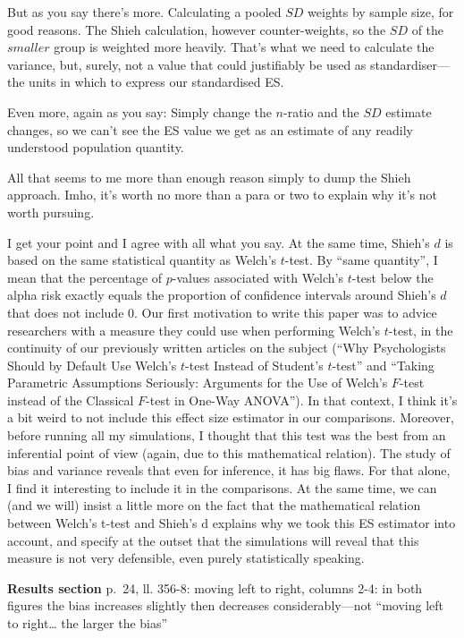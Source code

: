 \documentclass[
  12pt,
  french,
]{article}
\begin{document}
But as you say there's more. Calculating a pooled \(SD\) weights by
sample size, for good reasons. The Shieh calculation, however
counter-weights, so the \(SD\) of the \(smaller\) group is weighted more
heavily. That's what we need to calculate the variance, but, surely, not
a value that could justifiably be used as standardiser---the units in
which to express our standardised ES.

Even more, again as you say: Simply change the \(n\)-ratio and the
\(SD\) estimate changes, so we can't see the ES value we get as an
estimate of any readily understood population quantity.

All that seems to me more than enough reason simply to dump the Shieh
approach. Imho, it's worth no more than a para or two to explain why
it's not worth pursuing.

\color{blue} I get your point and I agree with all what you say. At the
same time, Shieh's \(d\) is based on the same statistical quantity as
Welch's \(t\)-test. By ``same quantity'', I mean that the percentage of
\(p\)-values associated with Welch's \(t\)-test below the alpha risk
exactly equals the proportion of confidence intervals around Shieh's
\(d\) that does not include 0. Our first motivation to write this paper
was to advice researchers with a measure they could use when performing
Welch's \(t\)-test, in the continuity of our previously written articles
on the subject (``Why Psychologists Should by Default Use Welch's
\(t\)-test Instead of Student's \(t\)-test'' and ``Taking Parametric
Assumptions Seriously: Arguments for the Use of Welch's \(F\)-test
instead of the Classical \(F\)-test in One-Way ANOVA''). In that
context, I think it's a bit weird to not include this effect size
estimator in our comparisons. Moreover, before running all my
simulations, I thought that this test was the best from an inferential
point of view (again, due to this mathematical relation). The study of
bias and variance reveals that even for inference, it has big flaws. For
that alone, I find it interesting to include it in the comparisons. At
the same time, we can (and we will) insist a little more on the fact
that the mathematical relation between Welch's t-test and Shieh's d
explains why we took this ES estimator into account, and specify at the
outset that the simulations will reveal that this measure is not very
defensible, even purely statistically speaking.

\color{black} \textbf{Results section} p.~24, ll. 356-8: moving left to
right, columns 2-4: in both figures the bias increases slightly then
decreases considerably---not ``moving left to right\ldots{} the larger
the bias''
\end{document}
